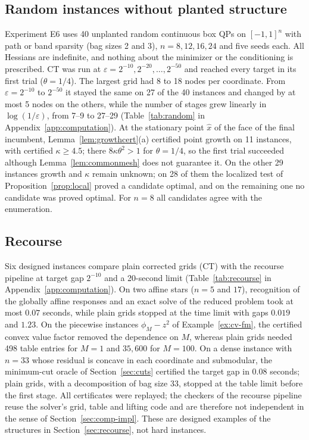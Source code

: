 \subsection{Random instances without planted structure}\label{sec:comp-random}
Experiment E6 uses 40 unplanted random continuous box QPs on $[-1,1]^n$ with
path or band sparsity (bag sizes 2 and 3), $n=8,12,16,24$ and five seeds
each. All Hessians are indefinite, and nothing about the minimizer or the
conditioning is prescribed. CT was run at
$\varepsilon=2^{-10},2^{-20},\dots,2^{-50}$ and reached every target in its
first trial ($\theta=1/4$). The largest grid had 8 to 18 nodes per coordinate.
From $\varepsilon=2^{-10}$ to $2^{-50}$ it stayed the same on 27 of the 40
instances and changed by at most 5 nodes on the others, while the number of
stages grew linearly in $\log(1/\varepsilon)$, from 7--9 to 27--29
(Table~\ref{tab:random} in Appendix~\ref{app:computation}). At the
stationary point $\hat x$ of the face of the final incumbent,
Lemma~\ref{lem:growthcert}(a) certified point growth on 11 instances, with
certified $\kappa\ge4.5$; there $8\kappa\theta^2>1$ for $\theta=1/4$, so the
first trial succeeded although Lemma~\ref{lem:commonmesh} does not guarantee
it. On the other 29 instances growth and $\kappa$ remain unknown; on 28 of
them the localized test of Proposition~\ref{prop:local} proved a candidate
optimal, and on the remaining one no candidate was proved optimal. For $n=8$
all candidates
agree with the enumeration.

\subsection{Recourse}\label{sec:comp-recourse}
Six designed instances compare plain corrected grids (CT) with the recourse
pipeline at target gap $2^{-10}$ and a 20-second limit
(Table~\ref{tab:recourse} in Appendix~\ref{app:computation}). On two affine
stars ($n=5$ and $17$), recognition of the globally affine responses and an
exact solve of the reduced problem took at most $0.07$ seconds, while plain
grids stopped at the time limit with gaps $0.019$ and $1.23$. On the
piecewise instances $\phi_M-z^2$ of Example~\ref{ex:cv-fm}, the certified
convex value factor removed the dependence on $M$, whereas plain grids needed
498 table entries for $M=1$ and $35{,}600$ for $M=100$. On a dense instance
with $n=33$ whose residual is concave in each coordinate and submodular, the
minimum-cut oracle of Section~\ref{sec:cuts} certified the target gap in
$0.08$ seconds; plain grids, with a decomposition of bag size 33, stopped at
the table limit before the first stage. All certificates were replayed; the
checkers of the recourse pipeline reuse the solver's grid, table and lifting
code and are therefore not independent in the sense of
Section~\ref{sec:comp-impl}. These are designed examples of the structures in
Section~\ref{sec:recourse}, not hard instances.

